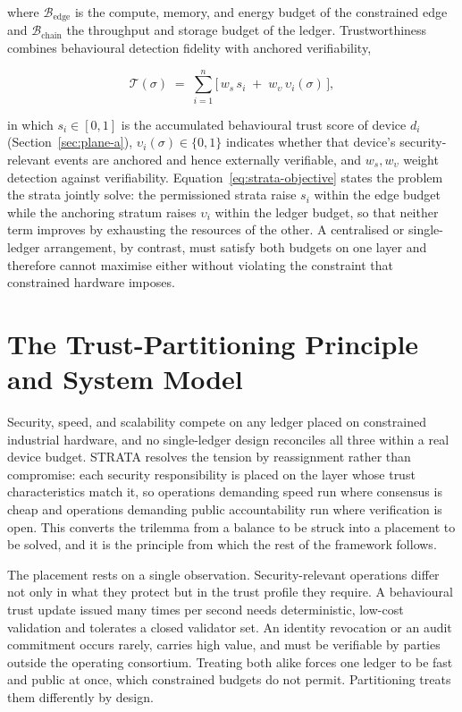 where $\mathcal{B}_{\text{edge}}$ is the compute, memory, and energy budget of the constrained edge and $\mathcal{B}_{\text{chain}}$ the throughput and storage budget of the ledger. Trustworthiness combines behavioural detection fidelity with anchored verifiability,

\begin{equation}
\label{eq:strata-trust}
\mathcal{T}(\sigma) \;=\; \sum_{i=1}^{n} \big[\, w_{s}\, s_i \;+\; w_{\upsilon}\, \upsilon_i(\sigma) \,\big],
\end{equation}

in which $s_i \in [0,1]$ is the accumulated behavioural trust score of device $d_i$ (Section~\ref{sec:plane-a}), $\upsilon_i(\sigma)\in\{0,1\}$ indicates whether that device's security-relevant events are anchored and hence externally verifiable, and $w_{s}, w_{\upsilon}$ weight detection against verifiability. Equation~\eqref{eq:strata-objective} states the problem the strata jointly solve: the permissioned strata raise $s_i$ within the edge budget while the anchoring stratum raises $\upsilon_i$ within the ledger budget, so that neither term improves by exhausting the resources of the other. A centralised or single-ledger arrangement, by contrast, must satisfy both budgets on one layer and therefore cannot maximise either without violating the constraint that constrained hardware imposes.



\section{The Trust-Partitioning Principle and System Model}
\label{sec:strata-principle}

Security, speed, and scalability compete on any ledger placed on constrained industrial hardware, and no single-ledger design reconciles all three within a real device budget. STRATA resolves the tension by reassignment rather than compromise: each security responsibility is placed on the layer whose trust characteristics match it, so operations demanding speed run where consensus is cheap and operations demanding public accountability run where verification is open. This converts the trilemma from a balance to be struck into a placement to be solved, and it is the principle from which the rest of the framework follows.

The placement rests on a single observation. Security-relevant operations differ not only in what they protect but in the trust profile they require. A behavioural trust update issued many times per second needs deterministic, low-cost validation and tolerates a closed validator set. An identity revocation or an audit commitment occurs rarely, carries high value, and must be verifiable by parties outside the operating consortium. Treating both alike forces one ledger to be fast and public at once, which constrained budgets do not permit. Partitioning treats them differently by design.

